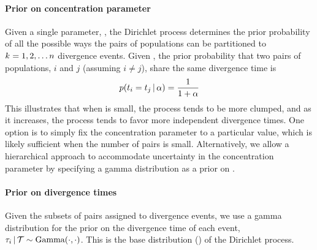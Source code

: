 \begin{linenomath}
\paragraph{Prior on concentration parameter}
Given a single parameter, \concentration, the Dirichlet process determines the
prior probability of all the possible ways the \ncomparisons{} pairs of
populations can be partitioned to $\nevents = 1, 2, \ldots \ncomparisons$
divergence events.
Given \concentration, the prior probability that two pairs of populations, $i$
and $j$ (assuming $i \neq j$), share the same divergence time is
\begin{equation}
    \pr(\comparisondivtime[i] = \comparisondivtime[j] \given \concentration)
    =
    \frac{1}{1 + \concentration}
\end{equation}
This illustrates that when \concentration is small, the process tends to be
more clumped, and as it increases, the process tends to favor more independent
divergence times.
One option is to simply fix the concentration parameter to a particular value,
which is likely sufficient when the number of pairs is small.
Alternatively, we allow a hierarchical approach to accommodate uncertainty in
the concentration parameter by specifying a gamma distribution as a prior on
\concentration \citep{Escobar1995,Heath2011}.
\end{linenomath}

\paragraph{Prior on divergence times}
Given the subsets of pairs assigned to divergence events, we use a gamma
distribution for the prior on the divergence time of each event,
$\divtime[i] \given \divtimesets \sim \distgamma(\cdot, \cdot)$.
This is the base distribution (\basedistribution) of the Dirichlet process.

